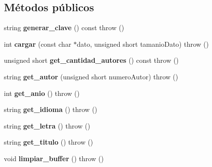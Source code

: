 \subsection*{\-Métodos públicos}
\begin{DoxyCompactItemize}
\item 
\hypertarget{class_registro_cancion_a48b568dac9de236a6e7b3a49236aea12}{string {\bfseries generar\-\_\-clave} () const   throw ()}\label{class_registro_cancion_a48b568dac9de236a6e7b3a49236aea12}

\item 
\hypertarget{class_registro_cancion_a364e0f4154f7ff47cf9a1f29b49605d0}{int {\bfseries cargar} (const char $\ast$dato, unsigned short tamanio\-Dato)  throw ()}\label{class_registro_cancion_a364e0f4154f7ff47cf9a1f29b49605d0}

\item 
\hypertarget{class_registro_cancion_aaa6ce1939abf45d5fa8d0e8396482aae}{unsigned short {\bfseries get\-\_\-cantidad\-\_\-autores} () const   throw ()}\label{class_registro_cancion_aaa6ce1939abf45d5fa8d0e8396482aae}

\item 
\hypertarget{class_registro_cancion_a9ede4ba8d3c1ebfe777afdc46a514571}{string {\bfseries get\-\_\-autor} (unsigned short numero\-Autor)  throw ()}\label{class_registro_cancion_a9ede4ba8d3c1ebfe777afdc46a514571}

\item 
\hypertarget{class_registro_cancion_a71c2dd2ad271ff7d0b2c7394195fc858}{int {\bfseries get\-\_\-anio} ()  throw ()}\label{class_registro_cancion_a71c2dd2ad271ff7d0b2c7394195fc858}

\item 
\hypertarget{class_registro_cancion_ab7ae01ed9dad5b5b87d28ee417bc8f1c}{string {\bfseries get\-\_\-idioma} ()  throw ()}\label{class_registro_cancion_ab7ae01ed9dad5b5b87d28ee417bc8f1c}

\item 
\hypertarget{class_registro_cancion_a66ea6fbc6aa0308c01ff948d20ca5367}{string {\bfseries get\-\_\-letra} ()  throw ()}\label{class_registro_cancion_a66ea6fbc6aa0308c01ff948d20ca5367}

\item 
\hypertarget{class_registro_cancion_af401a7ae86ee7e5a5c37bc229f27f159}{string {\bfseries get\-\_\-titulo} ()  throw ()}\label{class_registro_cancion_af401a7ae86ee7e5a5c37bc229f27f159}

\item 
\hypertarget{class_registro_cancion_a283fa753ab9406e40ab656062fa4046c}{void {\bfseries limpiar\-\_\-buffer} ()  throw ()}\label{class_registro_cancion_a283fa753ab9406e40ab656062fa4046c}


\end{DoxyCompactItemize}
